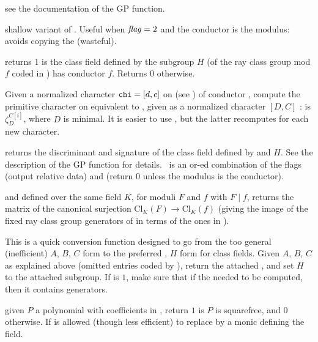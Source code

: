  see the documentation of
the GP function.

 shallow
variant of . Useful when $\hbox{\it f\kern0pt lag\/}=2$ and the conductor
is the  modulus: avoids copying the  (wasteful).

 returns 1 is the class field
defined by the subgroup $H$ (of the ray class group mod $f$ coded in )
has conductor $f$. Returns 0 otherwise.

Given a normalized character ${\tt chi} = [d,c]$ on  (see
) of conductor ,  compute the primitive
character  on  equivalent to , given as a
normalized character $[D,C]$ :  is $\zeta_D^{C[i]}$,
where $D$ is minimal. It is easier to use ,
but the latter recomputes  for each new character.

 returns the discriminant and
signature of the class field defined by  and $H$. See the description
of the GP function for details. \fl\ is an or-ed combination of the flags
 (output relative data) and  (return 0 unless the
modulus is the conductor).

  and 
defined over the same field $K$, for moduli $F$ and $f$ with
$F\mid f$, returns the matrix of the canonical surjection
$\text{Cl}_K(F)\to \text{Cl}_K(f)$ (giving the image of the fixed ray class
group generators of  in terms of the ones in ).

 This is a
quick conversion function designed to go from the too general (inefficient)
$A$, $B$, $C$ form to the preferred , $H$ form for class fields.
Given $A$, $B$, $C$ as explained above (omitted entries coded by ),
return the attached , and set $H$ to the attached subgroup. If
 is $1$, make sure that if the  needed to be computed,
then it contains generators.


 given $P$ a polynomial with
coefficients in , return $1$ is $P$ is squarefree, and $0$
otherwise. If is allowed (though less efficient) to replace 
by a monic  defining the field.

